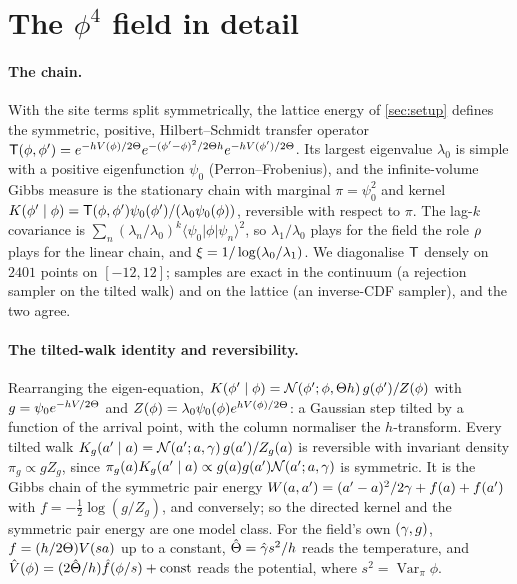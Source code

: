 \section{The $\phi^4$ field in detail}
\label{app:field}

\paragraph{The chain.}
With the site terms split symmetrically, the lattice energy of \cref{sec:setup} defines the symmetric, positive,
Hilbert--Schmidt transfer operator $\mathsf{T}(\phi,\phi')=e^{-h V(\phi)/2\Theta}e^{-(\phi'-\phi)^2/2\Theta h}e^{-h V(\phi')/2\Theta}$.
Its largest eigenvalue $\lambda_0$ is simple with a positive eigenfunction $\psi_0$ (Perron--Frobenius), and the
infinite-volume Gibbs measure is the stationary chain with marginal $\pi=\psi_0^2$ and kernel
$K(\phi'\mid\phi)=\mathsf{T}(\phi,\phi')\psi_0(\phi')/(\lambda_0\psi_0(\phi))$, reversible with respect to $\pi$. The lag-$k$
covariance is $\sum_n(\lambda_n/\lambda_0)^k\langle\psi_0|\phi|\psi_n\rangle^2$, so $\lambda_1/\lambda_0$ plays for the field the role
$\rho$ plays for the linear chain, and $\xi=1/\log(\lambda_0/\lambda_1)$. We diagonalise $\mathsf{T}$ densely on $2401$ points on
$[-12,12]$; samples are exact in the continuum (a rejection sampler on the tilted walk) and on the lattice (an inverse-CDF sampler), and
the two agree.

\paragraph{The tilted-walk identity and reversibility.}
Rearranging the eigen-equation, $K(\phi'\mid\phi)=\mathcal{N}\!\left(\phi';\phi,\Theta h\right)g(\phi')/Z(\phi)$ with $g=\psi_0e^{-h V/2\Theta}$ and
$Z(\phi)=\lambda_0\psi_0(\phi)e^{h V(\phi)/2\Theta}$: a Gaussian step tilted by a function of the arrival point, with the column normaliser the
$h$-transform. Every tilted walk $K_g(a'\mid a)=\mathcal{N}\!\left(a';a,\gamma\right)g(a')/Z_g(a)$ is reversible with invariant density $\pi_g\propto gZ_g$, since
$\pi_g(a)K_g(a'\mid a)\propto g(a)g(a')\mathcal{N}\!\left(a';a,\gamma\right)$ is symmetric. It is the Gibbs chain of the symmetric pair energy
$W(a,a')=(a'-a)^2/2\gamma+f(a)+f(a')$ with $f=-\tfrac12\log(g/Z_g)$, and conversely; so the directed kernel and the symmetric pair energy are one model
class. For the field's own $(\gamma,g)$, $f=(h/2\Theta)V(sa)$ up to a constant, $\hat{\Theta}=\hat{\gamma} s^2/h$ reads the temperature, and
$\hat V(\phi)=(2\hat{\Theta}/h)\hat f(\phi/s)+\mathrm{const}$ reads the potential, where $s^2=\operatorname{Var}_\pi\phi$.

